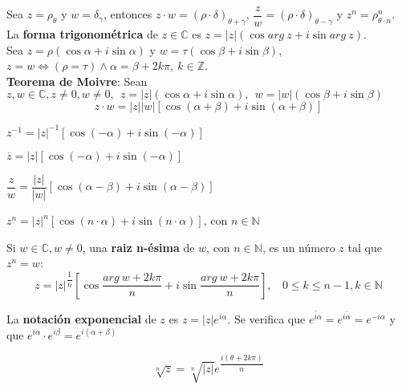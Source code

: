 \documentclass[11pt,a4paper]{article}
\begin{document}
\noindent Sea $z=\rho_{\theta}$ y $w=\delta_\gamma$, entonces \quad $z\cdot w = (\rho \cdot \delta)_{\theta+\gamma}$, \quad $\dfrac{z}{w} = (\rho \cdot \delta)_{\theta-\gamma}$ \quad y \quad $z^n = \rho^n_{\theta \cdot n}$.\\

\noindent La \textbf{forma trigonom\'etrica} de $z \in \mathbb{C}$ es $z = |z| (\cos arg\ z + i \sin arg\ z)$.\\
\noindent Sea $z=\rho (\cos \alpha + i \sin \alpha)$ y $w = \tau (\cos \beta + i \sin \beta)$, $z=w \iff (\rho = \tau) \land \alpha = \beta + 2k\pi,\ k \in \mathbb{Z}$.\\

\noindent \textbf{Teorema de Moivre}: Sean $z,w \in \mathbb{C}, z\not=0, w\not=0,\ \ z=|z|(\cos \alpha + i \sin \alpha),\ \ w = |w| (\cos \beta + i \sin \beta)$
$$z \cdot w = |z||w|[\cos (\alpha + \beta) + i\sin(\alpha+\beta)]$$

\begin{itemize}
\begin{multicols}{2}
\item $z^{-1} = |z|^{-1}[\cos (-\alpha) + i \sin (-\alpha)]$
\item $\overline{z} = |z|[\cos (-\alpha) + i \sin (-\alpha)]$
\item $\dfrac{z}{w} = \dfrac{|z|}{|w|} [\cos (\alpha - \beta) + i \sin (\alpha - \beta)]$
\item $z^n = |z|^n [\cos (n\cdot\alpha) + i \sin (n\cdot\alpha)]$, con $n\in\mathbb{N}$
\end{multicols}
\end{itemize}

\noindent Si $w\in\mathbb{C}, w\not=0$, una \textbf{raiz n-\'esima} de $w$, con $n\in\mathbb{N}$, es un n\'umero $z$ tal que $z^n=w$:
$$z = |z|^{\dfrac{1}{n}} \left[\cos \dfrac{arg\ w + 2k\pi}{n} + i \sin \dfrac{arg\ w + 2k\pi}{n}\right], \ \ \ \ 0 \leq k \leq n-1, k \in \mathbb{N}$$

\noindent La \textbf{notaci\'on exponencial} de $z$ es $z=|z|e^{i\alpha}$. Se verifica que $\overline{e^{i\alpha}} = e^{\overline{i\alpha}} = e^{-i\alpha}$ y que $e^{i\alpha} \cdot e^{i\beta} = e^{i(\alpha+\beta)}$

$$\sqrt[n]{z} = \sqrt[n]{|z|} e^{\dfrac{i(\theta + 2k\pi)}{n}}$$
\end{document}
